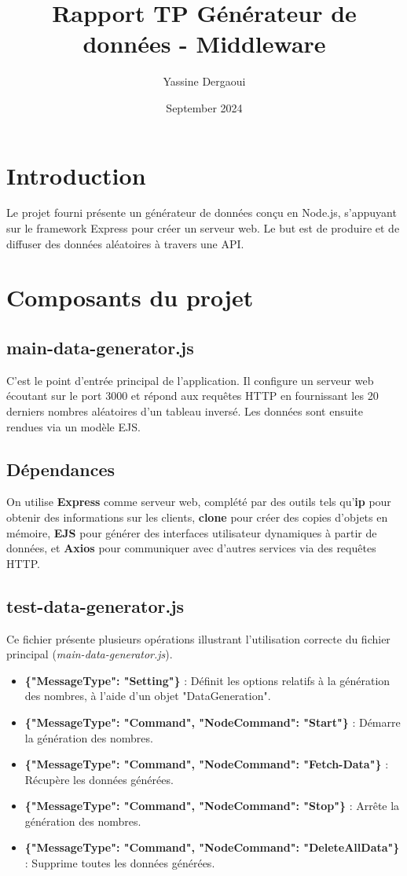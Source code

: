 \documentclass{article}
\title{Rapport TP Générateur de données - Middleware}
\author{Yassine Dergaoui}
\date{September 2024}
\begin{document}
\maketitle

\section{Introduction}
Le projet fourni présente un générateur de données conçu en Node.js, s'appuyant sur le framework Express pour créer un serveur web. Le but est de produire et de diffuser des données aléatoires à travers une API.

\section{Composants du projet}

\subsection{main-data-generator.js}
C'est le point d'entrée principal de l'application. Il configure un serveur web écoutant sur le port 3000 et répond aux requêtes HTTP en fournissant les 20 derniers nombres aléatoires d'un tableau inversé. Les données sont ensuite rendues via un modèle EJS.

\subsection{Dépendances}
On utilise \textbf{Express} comme serveur web, complété par des outils tels qu'\textbf{ip} pour obtenir des informations sur les clients, \textbf{clone} pour créer des copies d'objets en mémoire, \textbf{EJS} pour générer des interfaces utilisateur dynamiques à partir de données, et \textbf{Axios} pour communiquer avec d'autres services via des requêtes HTTP.

\subsection{test-data-generator.js}
Ce fichier présente plusieurs opérations illustrant l'utilisation correcte du fichier principal (\textit{main-data-generator.js}).

\begin{itemize}
    \item \textbf{\{"MessageType": "Setting"\}} : Définit les options relatifs à la génération des nombres, à l'aide d'un objet "DataGeneration".
    \item \textbf{\{"MessageType": "Command", "NodeCommand": "Start"\}} : Démarre la génération des nombres.
    \item \textbf{\{"MessageType": "Command", "NodeCommand": "Fetch-Data"\}} : Récupère les données générées.
    \item \textbf{\{"MessageType": "Command", "NodeCommand": "Stop"\}} : Arrête la génération des nombres.
    \item \textbf{\{"MessageType": "Command", "NodeCommand": "DeleteAllData"\}} : Supprime toutes les données générées.
\end{itemize}
\end{document}
